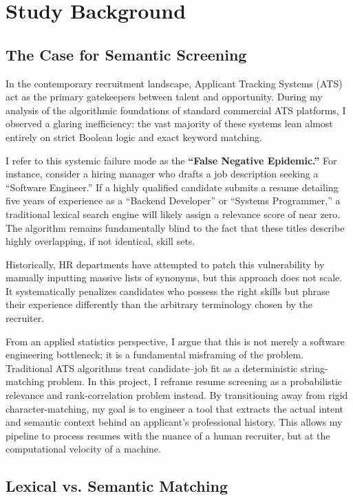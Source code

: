 \chapter{Study Background}
\label{ch:study_background}

\section{The Case for Semantic Screening}
\label{sec:background_survey}

In the contemporary recruitment landscape, Applicant Tracking Systems (ATS) act as the primary gatekeepers between talent and opportunity. During my analysis of the algorithmic foundations of standard commercial ATS platforms, I observed a glaring inefficiency: the vast majority of these systems lean almost entirely on strict Boolean logic and exact keyword matching.

I refer to this systemic failure mode as the \textbf{``False Negative Epidemic.''} For instance, consider a hiring manager who drafts a job description seeking a ``Software Engineer.'' If a highly qualified candidate submits a resume detailing five years of experience as a ``Backend Developer'' or ``Systems Programmer,'' a traditional lexical search engine will likely assign a relevance score of near zero. The algorithm remains fundamentally blind to the fact that these titles describe highly overlapping, if not identical, skill sets.

Historically, HR departments have attempted to patch this vulnerability by manually inputting massive lists of synonyms, but this approach does not scale. It systematically penalizes candidates who possess the right skills but phrase their experience differently than the arbitrary terminology chosen by the recruiter.

From an applied statistics perspective, I argue that this is not merely a software engineering bottleneck; it is a fundamental misframing of the problem. Traditional ATS algorithms treat candidate--job fit as a deterministic string-matching problem. In this project, I reframe resume screening as a probabilistic relevance and rank-correlation problem instead. By transitioning away from rigid character-matching, my goal is to engineer a tool that extracts the actual intent and semantic context behind an applicant's professional history. This allows my pipeline to process resumes with the nuance of a human recruiter, but at the computational velocity of a machine.


\section{Lexical vs. Semantic Matching}
\label{sec:taxonomy}

